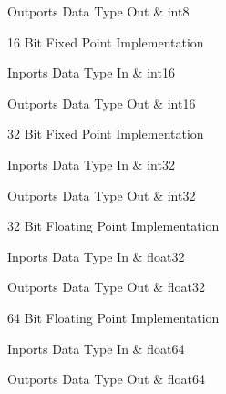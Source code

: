 \begin{XtoCtabular}{Outports Data Type}
Out & int8\tabularnewline
\hline
\end{XtoCtabular}

\ifdefined \AddTestReports
{}
\fi
{}
\nopagebreak[0]

16 Bit Fixed Point Implementation

\begin{XtoCtabular}{Inports Data Type}
In & int16\tabularnewline
\hline
\end{XtoCtabular}

\begin{XtoCtabular}{Outports Data Type}
Out & int16\tabularnewline
\hline
\end{XtoCtabular}

\ifdefined \AddTestReports
{}
\fi
{}
\nopagebreak[0]

32 Bit Fixed Point Implementation

\begin{XtoCtabular}{Inports Data Type}
In & int32\tabularnewline
\hline
\end{XtoCtabular}

\begin{XtoCtabular}{Outports Data Type}
Out & int32\tabularnewline
\hline
\end{XtoCtabular}

\ifdefined \AddTestReports
{}
\fi
{}
\nopagebreak[0]

32 Bit Floating Point Implementation

\begin{XtoCtabular}{Inports Data Type}
In & float32\tabularnewline
\hline
\end{XtoCtabular}

\begin{XtoCtabular}{Outports Data Type}
Out & float32\tabularnewline
\hline
\end{XtoCtabular}

\ifdefined \AddTestReports
{}
\fi
{}
\nopagebreak[0]

64 Bit Floating Point Implementation

\begin{XtoCtabular}{Inports Data Type}
In & float64\tabularnewline
\hline
\end{XtoCtabular}

\begin{XtoCtabular}{Outports Data Type}
Out & float64\tabularnewline
\hline
\end{XtoCtabular}

\ifdefined \AddTestReports
{}
\fi
